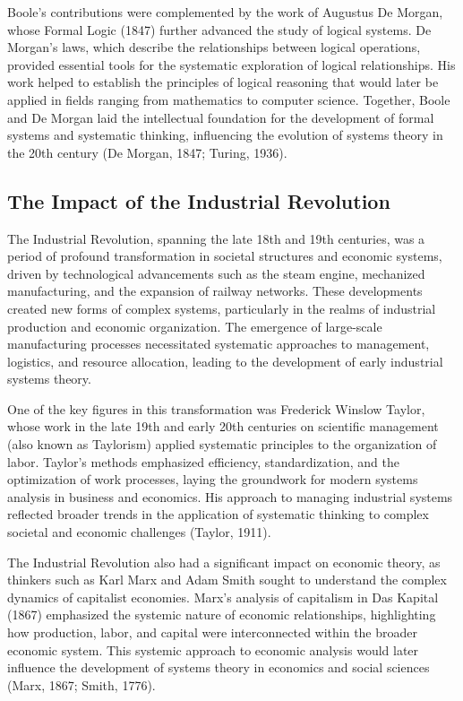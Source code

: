\documentclass[twocolumn]{article}
\begin{document}
\textcolor{primary}{Boole’s contributions were complemented by the work of Augustus De Morgan, whose Formal Logic (1847) further advanced the study of logical systems. De Morgan’s laws, which describe the relationships between logical operations, provided essential tools for the systematic exploration of logical relationships. His work helped to establish the principles of logical reasoning that would later be applied in fields ranging from mathematics to computer science. Together, Boole and De Morgan laid the intellectual foundation for the development of formal systems and systematic thinking, influencing the evolution of systems theory in the 20th century (De Morgan, 1847; Turing, 1936).}

\subsection{The Impact of the Industrial Revolution}

\textcolor{primary}{The Industrial Revolution, spanning the late 18th and 19th centuries, was a period of profound transformation in societal structures and economic systems, driven by technological advancements such as the steam engine, mechanized manufacturing, and the expansion of railway networks. These developments created new forms of complex systems, particularly in the realms of industrial production and economic organization. The emergence of large-scale manufacturing processes necessitated systematic approaches to management, logistics, and resource allocation, leading to the development of early industrial systems theory.}

\textcolor{secondary}{One of the key figures in this transformation was Frederick Winslow Taylor, whose work in the late 19th and early 20th centuries on scientific management (also known as Taylorism) applied systematic principles to the organization of labor. Taylor’s methods emphasized efficiency, standardization, and the optimization of work processes, laying the groundwork for modern systems analysis in business and economics. His approach to managing industrial systems reflected broader trends in the application of systematic thinking to complex societal and economic challenges (Taylor, 1911).}

\textcolor{primary}{The Industrial Revolution also had a significant impact on economic theory, as thinkers such as Karl Marx and Adam Smith sought to understand the complex dynamics of capitalist economies. Marx’s analysis of capitalism in Das Kapital (1867) emphasized the systemic nature of economic relationships, highlighting how production, labor, and capital were interconnected within the broader economic system. This systemic approach to economic analysis would later influence the development of systems theory in economics and social sciences (Marx, 1867; Smith, 1776).}
\end{document}
